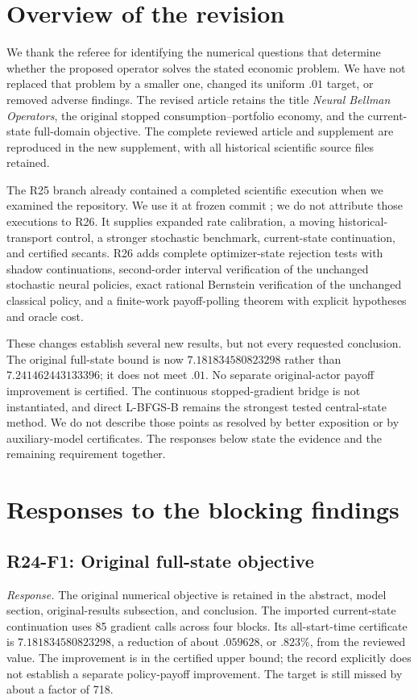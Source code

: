 \section{Overview of the revision}
We thank the referee for identifying the numerical questions that determine whether the proposed operator solves the stated economic problem. We have not replaced that problem by a smaller one, changed its uniform $.01$ target, or removed adverse findings. The revised article retains the title \emph{Neural Bellman Operators}, the original stopped consumption--portfolio economy, and the current-state full-domain objective. The complete reviewed article and supplement are reproduced in the new supplement, with all historical scientific source files retained.

The R25 branch already contained a completed scientific execution when we examined the repository. We use it at frozen commit ; we do not attribute those executions to R26. It supplies expanded rate calibration, a moving historical-transport control, a stronger stochastic benchmark, current-state continuation, and certified secants. R26 adds complete optimizer-state rejection tests with shadow continuations, second-order interval verification of the unchanged stochastic neural policies, exact rational Bernstein verification of the unchanged classical policy, and a finite-work payoff-polling theorem with explicit hypotheses and oracle cost.

These changes establish several new results, but not every requested conclusion. The original full-state bound is now $7.181834580823298$ rather than $7.241462443133396$; it does not meet $.01$. No separate original-actor payoff improvement is certified. The continuous stopped-gradient bridge is not instantiated, and direct L-BFGS-B remains the strongest tested central-state method. We do not describe those points as resolved by better exposition or by auxiliary-model certificates. The responses below state the evidence and the remaining requirement together.

\section{Responses to the blocking findings}
\subsection{R24-F1: Original full-state objective}
\emph{Response.} The original numerical objective is retained in the abstract, model section, original-results subsection, and conclusion. The imported current-state continuation uses 85 gradient calls across four blocks. Its all-start-time certificate is $7.181834580823298$, a reduction of about $.059628$, or $.823\%$, from the reviewed value. The improvement is in the certified upper bound; the record explicitly does not establish a separate policy-payoff improvement. The target is still missed by about a factor of 718.

